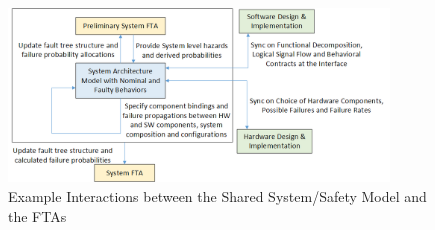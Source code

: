 \begin{figure}[t!]
	\vspace{-0.19in}
	\centering
	\includegraphics[width=0.9\textwidth]{images/FTA_MBD_Workflow.png}
	\caption{Example Interactions between the Shared System/Safety Model and the FTAs}
	\label{fig:interaction_with_FTA}
\end{figure}
